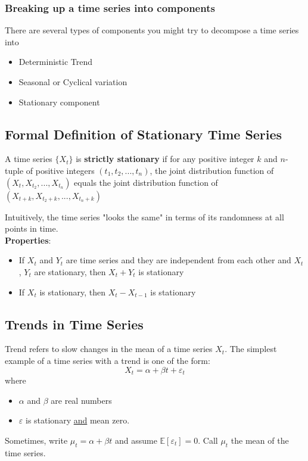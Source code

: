 \subsubsection{Breaking up a time series into components}
There are several types of components you might try to decompose a time series into
\begin{itemize}
    \item Deterministic Trend
    \item Seasonal or Cyclical variation
    \item Stationary component
\end{itemize}

\subsection{Formal Definition of Stationary Time Series}

\begin{mdframed}
A time series $\{X_t\}$ is \textbf{strictly stationary} if for any positive integer $k$ and $n$-tuple of positive integers $(t_1,t_2,...,t_n)$, the joint distribution function of $(X_t, X_{t_2},...,X_{t_n})$ equals the joint distribution function of $(X_{t+k}, X_{t_2+k}, ..., X_{t_n+k})$
\end{mdframed}


Intuitively, the time series "looks the same" in terms of its randomness at all points in time.\\

\textbf{Properties}:
\begin{itemize}
    \item If $X_t$ and $Y_t$ are time series and they are independent from each other and $X_t$, $Y_t$ are stationary, then $X_t + Y_t$ is stationary
    \item If $X_t$ is stationary, then $X_t - X_{t-1}$ is stationary
\end{itemize}


\subsection{Trends in Time Series}

Trend refers to slow changes in the mean of a time series $X_t$. The simplest example of a time series with a trend is one of the form:\[
X_t = \alpha + \beta t + \varepsilon_t
\]
where \begin{itemize}
    \item $\alpha$ and $\beta$ are real numbers
    \item $\varepsilon$ is stationary \underline{and} mean zero.
\end{itemize}
Sometimes, write $\mu_t = \alpha + \beta t$ and assume $\mathbb{E}[\varepsilon_t]=0$. Call $\mu_t$ the mean of the time series. \\

